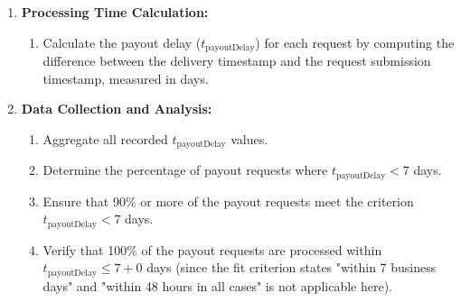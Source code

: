 \documentclass[12pt, titlepage]{article}
\begin{document}
\begin{enumerate}
\begin{enumerate}
    \item \textbf{Processing Time Calculation:}
    \begin{enumerate}
        \item Calculate the payout delay ($t_{\text{payoutDelay}}$) for each request by computing the difference between the delivery timestamp and the request submission timestamp, measured in days.
    \end{enumerate}
    
    \item \textbf{Data Collection and Analysis:}
    \begin{enumerate}
        \item Aggregate all recorded $t_{\text{payoutDelay}}$ values.
        \item Determine the percentage of payout requests where $t_{\text{payoutDelay}} < 7$ days.
        \item Ensure that 90\% or more of the payout requests meet the criterion $t_{\text{payoutDelay}} < 7$ days.
        \item Verify that 100\% of the payout requests are processed within $t_{\text{payoutDelay}} \leq 7 + 0$ days (since the fit criterion states "within 7 business days" and "within 48 hours in all cases" is not applicable here).
    \end{enumerate}
    
\end{enumerate}

\end{enumerate}

\end{document}
